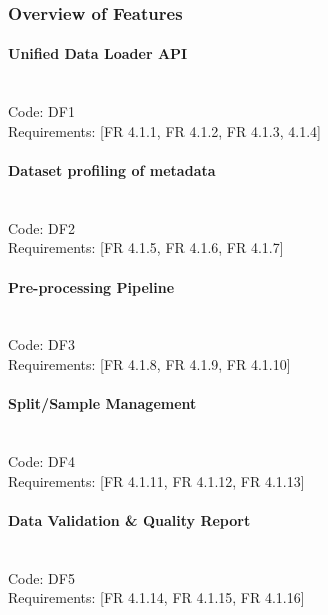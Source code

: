 \documentclass{article}
\begin{document}
\subsubsection{Overview of Features}
\paragraph{Unified Data Loader API} \mbox{} \\
\noindent Code: DF1 \\
\noindent Requirements: [FR 4.1.1, FR 4.1.2, FR 4.1.3, 4.1.4] 

\paragraph{Dataset profiling of metadata}  \mbox{} \\
\noindent Code: DF2 \\
\noindent Requirements: [FR 4.1.5, FR 4.1.6, FR 4.1.7] 

\paragraph{Pre-processing Pipeline} \mbox{} \\
\noindent Code: DF3 \\
\noindent Requirements: [FR 4.1.8, FR 4.1.9, FR 4.1.10] 

\paragraph{Split/Sample Management} \mbox{} \\
\noindent Code: DF4 \\
\noindent Requirements: [FR 4.1.11, FR 4.1.12, FR 4.1.13] 

\paragraph{Data Validation \& Quality Report} \mbox{} \\
\noindent Code: DF5 \\
\noindent Requirements: [FR 4.1.14, FR 4.1.15, FR 4.1.16] 
\end{document}
